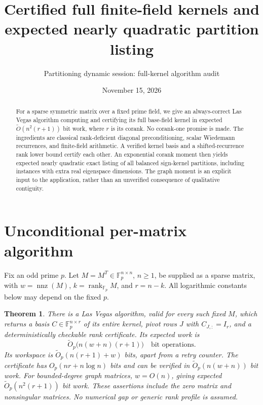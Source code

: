 \documentclass[11pt]{article}
\title{Certified full finite-field kernels and expected nearly quadratic partition listing}
\author{Partitioning dynamic session: full-kernel algorithm audit}
\date{November 15, 2026}
\newtheorem{theorem}{Theorem}
\newcommand{\F}{\mathbb F}
\newcommand{\rank}{\operatorname{rank}}
\newcommand{\nnz}{\operatorname{nnz}}
\begin{document}
\maketitle
\begin{abstract}
For a sparse symmetric matrix over a fixed prime field, we give an
always-correct Las Vegas algorithm computing and certifying its full
base-field kernel in expected $\widetilde O(n^2(r+1))$ bit work,
where $r$ is its corank. No corank-one promise is made.
The ingredients are classical rank-deficient diagonal preconditioning,
scalar Wiedemann recurrences, and finite-field arithmetic. A verified
kernel basis and a shifted-recurrence rank lower bound certify each
other. An exponential corank moment then yields expected nearly
quadratic exact listing of all balanced sign-kernel partitions,
including instances with extra real eigenspace dimensions. The graph
moment is an explicit input to the application, rather than an
unverified consequence of qualitative contiguity.
\end{abstract}

\section{Unconditional per-matrix algorithm}
Fix an odd prime $p$. Let $M=M^T\in\F_p^{n\times n}$, $n\ge1$,
be supplied as a sparse matrix, with $w=\nnz(M)$,
$k=\rank_{\F_p}M$, and $r=n-k$.
All logarithmic constants below may depend on the fixed $p$.

\begin{theorem}\label{thm:kernel}
There is a Las Vegas algorithm, valid for every such fixed $M$,
which returns a basis $C\in\F_p^{n\times r}$ of its entire kernel,
pivot rows $J$ with $C_{J,:}=I_r$, and a deterministically checkable
rank certificate. Its expected work is
\[
 \widetilde O_p\bigl(n(w+n)(r+1)\bigr)
 \quad\text{bit operations}.
\]
Its workspace is $\widetilde O_p(n(r+1)+w)$ bits, apart from a retry
counter. The certificate has $O_p(nr+n\log n)$ bits and can be
verified in $\widetilde O_p(n(w+n))$ bit work.
For bounded-degree graph matrices, $w=O(n)$, giving expected
$\widetilde O_p(n^2(r+1))$ bit work. These assertions include the
zero matrix and nonsingular matrices. No numerical gap or generic
rank profile is assumed.
\end{theorem}
\end{document}
